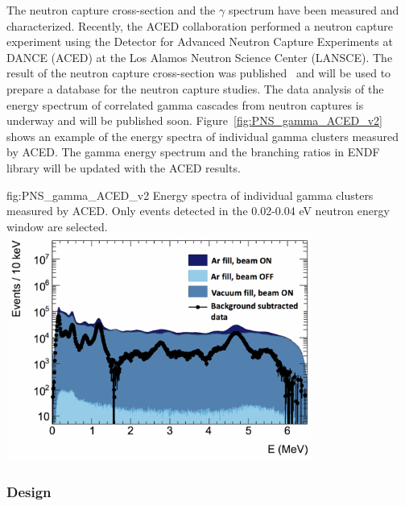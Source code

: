 The neutron capture cross-section and the $\gamma$ spectrum have been measured and characterized. Recently, the ACED  collaboration performed a neutron capture experiment using  the Detector  for Advanced  Neutron  Capture  Experiments  at DANCE (ACED)  at the  Los  Alamos  Neutron  Science  Center  (LANSCE). The result of the neutron capture cross-section was published~\cite{Fischer:2019qfr} and will be used to prepare a database for the neutron capture studies. The data analysis of the energy spectrum of correlated gamma cascades from neutron captures is underway and will be published soon. Figure~\ref{fig:PNS_gamma_ACED_v2} shows an example of the energy spectra of individual gamma clusters measured by ACED. The gamma energy spectrum and the branching ratios in ENDF  library will be updated with the ACED results. 

\begin{dunefigure}{fig:PNS_gamma_ACED_v2}
{Energy spectra of individual gamma clusters measured by ACED. Only events detected in the 0.02-0.04 eV neutron energy window are selected.}
\includegraphics[width=10cm]{graphics/PNS_gamma_ACED_v2.png}
\end{dunefigure}


\subsubsection{Design}
\label{sec:sp-calib-sys-pns-des}


